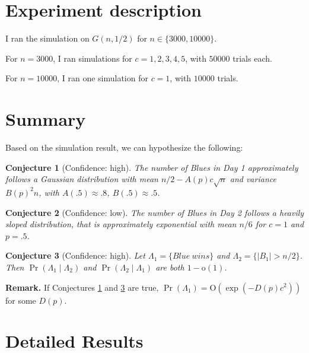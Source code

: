 \documentclass[12]{article}
\newtheorem{conjecture}{Conjecture}
\theoremstyle{definition}
\begin{document}
\section{Experiment description}

I ran the simulation on $G(n, 1/2)$ for $n\in \{3000,10000\}$.

For $n = 3000$, I ran simulations for $c = 1, 2, 3, 4, 5$, with $50000$ trials each.

For $n = 10000$, I ran one simulation for $c = 1$, with $10000$ trials.



\section{Summary}

Based on the simulation result, we can hypothesize the following:

\begin{conjecture}[Confidence: high]  \label{conj:day1}
The number of Blues in Day 1 approximately follows a Gaussian distribution with mean $n/2 - A(p)c\sqrt{n}$ and variance $B(p)^2n$, with $A(.5) \approx .8$, $B(.5) \approx .5$.
\end{conjecture}

\begin{conjecture}[Confidence: low] \label{conj:day2}
The number of Blues in Day 2 follows a heavily sloped distribution, that is approximately exponential with mean $n/6$ for $c = 1$ and $p = .5$.
\end{conjecture}

\begin{conjecture}[Confidence: high] \label{conj:blue-win-day1-adv}
Let $\Lambda_1 = \{Blue\ wins\}$ and $\Lambda_2 = \{|B_1| > n/2 \}$. Then $\Pr(\Lambda_1\mid \Lambda_2)$ and $\Pr(\Lambda_2\mid \Lambda_1)$ are both $1 - \text{o}(1)$.
\end{conjecture}

\textbf{Remark.} If Conjectures \ref{conj:day1} and \ref{conj:blue-win-day1-adv} are true, $\Pr(\Lambda_1) = \text{O}(\exp(-D(p)c^2))$ for some $D(p)$.

\section{Detailed Results}

\newcommand{\plotvoting}[3]{
\begin{tabular}{cc}
Distribution & Log-distribution \\[-0.4em]
\texttt{[image: \#1\_half\_\#2\_day\#3.png]}
& 
\texttt{[image: \#1\_half\_\#2\_day\#3\_log.png]}
\end{tabular}
}
\end{document}
